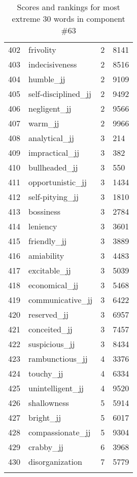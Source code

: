 \begin{longtable}[!htbp]{| rlr@{.}l |}
    402 & frivolity & 2 & 8141 \\
    403 & indecisiveness & 2 & 8516 \\
    404 & humble\_jj & 2 & 9109 \\
    405 & self-disciplined\_jj & 2 & 9492 \\
    406 & negligent\_jj & 2 & 9566 \\
    407 & warm\_jj & 2 & 9966 \\
    408 & analytical\_jj & 3 & 214 \\
    409 & impractical\_jj & 3 & 382 \\
    410 & bullheaded\_jj & 3 & 550 \\
    411 & opportunistic\_jj & 3 & 1434 \\
    412 & self-pitying\_jj & 3 & 1810 \\
    413 & bossiness & 3 & 2784 \\
    414 & leniency & 3 & 3601 \\
    415 & friendly\_jj & 3 & 3889 \\
    416 & amiability & 3 & 4483 \\
    417 & excitable\_jj & 3 & 5039 \\
    418 & economical\_jj & 3 & 5468 \\
    419 & communicative\_jj & 3 & 6422 \\
    420 & reserved\_jj & 3 & 6957 \\
    421 & conceited\_jj & 3 & 7457 \\
    422 & suspicious\_jj & 3 & 8434 \\
    423 & rambunctious\_jj & 4 & 3376 \\
    424 & touchy\_jj & 4 & 6334 \\
    425 & unintelligent\_jj & 4 & 9520 \\
    426 & shallowness & 5 & 5914 \\
    427 & bright\_jj & 5 & 6017 \\
    428 & compassionate\_jj & 5 & 9304 \\
    429 & crabby\_jj & 6 & 3968 \\
    430 & disorganization & 7 & 5779 \\
    \hline
    \caption{Scores and rankings for most extreme 30 words in component \#63} \\
\end{longtable}
